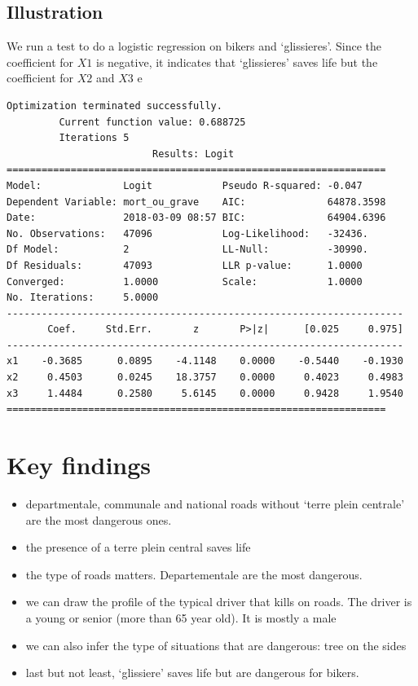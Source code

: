 \documentclass[a4paper]{article}
\theoremstyle{definition}
\theoremstyle{proposition}
\begin{document}
\subsection{Illustration}
We run a test to do a logistic regression on bikers and `glissieres'. Since the coefficient for $X1$ is negative, it indicates that `glissieres' saves life but the coefficient for $X2$ and $X3$ e
\begin{verbatim}
Optimization terminated successfully.
         Current function value: 0.688725
         Iterations 5
                         Results: Logit
=================================================================
Model:              Logit            Pseudo R-squared: -0.047    
Dependent Variable: mort_ou_grave    AIC:              64878.3598
Date:               2018-03-09 08:57 BIC:              64904.6396
No. Observations:   47096            Log-Likelihood:   -32436.   
Df Model:           2                LL-Null:          -30990.   
Df Residuals:       47093            LLR p-value:      1.0000    
Converged:          1.0000           Scale:            1.0000    
No. Iterations:     5.0000                                       
--------------------------------------------------------------------
       Coef.     Std.Err.       z       P>|z|      [0.025     0.975]
--------------------------------------------------------------------
x1    -0.3685      0.0895    -4.1148    0.0000    -0.5440    -0.1930
x2     0.4503      0.0245    18.3757    0.0000     0.4023     0.4983
x3     1.4484      0.2580     5.6145    0.0000     0.9428     1.9540
=================================================================

\end{verbatim}



\section{Key findings}
\begin{itemize}
\item departmentale, communale and national roads without `terre plein centrale' are the most dangerous ones.
\item the presence of a terre plein central saves life
\item the type of roads matters. Departementale are the most dangerous.
\item we can draw the profile of the typical driver that kills on roads. The driver is a young or senior (more than 65 year old). It is mostly a male
\item we can also infer the type of situations that are dangerous: tree on the sides 
\item last but not least, `glissiere' saves life but are dangerous for bikers.
\end{itemize}
\end{document}

